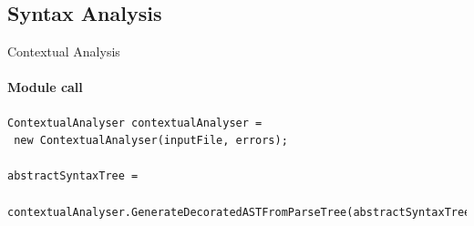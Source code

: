 \subsection{Syntax Analysis}

\begin{frame}[fragile]{Contextual Analysis}
\framesubtitle{Module call}

    \begin{lstlisting}[caption=The creation of an instance of the Contextual analysis module and the call invoking it. ,frame=tlrb, basicstyle=\tiny, numbers=none]
ContextualAnalyser contextualAnalyser = 
 new ContextualAnalyser(inputFile, errors);

abstractSyntaxTree = 
 contextualAnalyser.GenerateDecoratedASTFromParseTree(abstractSyntaxTree);
    \end{lstlisting}


\end{frame}

